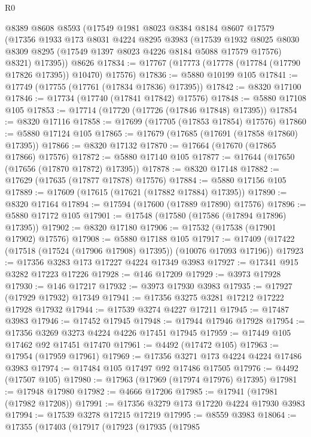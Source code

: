 \begin{lexlean}{R0}
\begin{coremodule}
    @8389
    @8608
    @8593
    (@17549
      @1981
      @8023
      @8384
      @8184
      @8607
      @17579
      (@17356
        @1933
        @173
        @8031
        @4224
        @8295
        @3983
        (@17539
          @1932
          @8025
          @8030
          @8309
          @8295
          (@17549 @1397 @8023 @4226 @8184 @5088 @17579 @17576)
          @8321)
        @17395))
    @8626
@17834 := @17767 (@17773 (@17778 (@17784 (@17790 @17826 @17395)) @10470) @17576)
@17836 := @5880 @10199 @105
@17841 := @17749 (@17755 (@17761 (@17834 @17836) @17395))
@17842 := @8320 @17100
@17846 := @17734 (@17740 (@17841 @17842) @17576)
@17848 := @5880 @17108 @105
@17853 := @17714 (@17720 (@17726 (@17846 @17848) @17395))
@17854 := @8320 @17116
@17858 := @17699 (@17705 (@17853 @17854) @17576)
@17860 := @5880 @17124 @105
@17865 := @17679 (@17685 (@17691 (@17858 @17860) @17395))
@17866 := @8320 @17132
@17870 := @17664 (@17670 (@17865 @17866) @17576)
@17872 := @5880 @17140 @105
@17877 := @17644 (@17650 (@17656 (@17870 @17872) @17395))
@17878 := @8320 @17148
@17882 := @17629 (@17635 (@17877 @17878) @17576)
@17884 := @5880 @17156 @105
@17889 := @17609 (@17615 (@17621 (@17882 @17884) @17395))
@17890 := @8320 @17164
@17894 := @17594 (@17600 (@17889 @17890) @17576)
@17896 := @5880 @17172 @105
@17901 := @17548 (@17580 (@17586 (@17894 @17896) @17395))
@17902 := @8320 @17180
@17906 := @17532 (@17538 (@17901 @17902) @17576)
@17908 := @5880 @17188 @105
@17917 := @17409 (@17422 (@17518 (@17524 (@17906 @17908) @17395)) (@10076 @17093 @17196))
@17923 := @17356 @3283 @173 @17227 @4224 @17349 @3983
@17927 := @17341 @915 @3282 @17223 @17226
@17928 := @146 @17209
@17929 := @3973 @17928
@17930 := @146 @17217
@17932 := @3973 @17930 @3983
@17935 := @17927 (@17929 @17932) @17349
@17941 := @17356 @3275 @3281 @17212 @17222 @17928 @17932
@17944 := @17539 @3274 @4227 @17211
@17945 := @17487 @3983
@17946 := @17452 @17945
@17948 := @17944 @17946 @17928
@17954 := @17356 @3269 @3273 @4224 @4226 @17451 @17945
@17959 := @17449 @105 @17462 @92 @17451 @17470
@17961 := @4492 (@17472 @105)
@17963 := @17954 (@17959 @17961)
@17969 := @17356 @3271 @173 @4224 @4224 @17486 @3983
@17974 := @17484 @105 @17497 @92 @17486 @17505
@17976 := @4492 (@17507 @105)
@17980 := @17963 (@17969 (@17974 @17976) @17395)
@17981 := @17948 @17980
@17982 := @4666 @17206
@17985 := @17941 (@17981 (@17982 @17208))
@17991 := @17356 @3279 @173 @17220 @4224 @17930 @3983
@17994 := @17539 @3278 @17215 @17219
@17995 := @8559 @3983
@18064 := @17355
    (@17403
      (@17917
        (@17923
          (@17935
            (@17985

\end{coremodule}
\end{lexlean}
